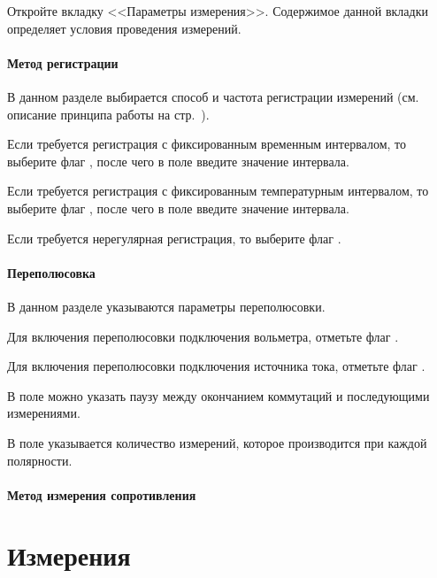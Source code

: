 \documentclass[12pt, a4paper, twocolumn]{report}
\begin{document}
Откройте вкладку <<Параметры измерения>>. Содержимое данной вкладки определяет условия проведения измерений.

\subsubsection{Метод регистрации}
\label{sec_reg_method}

В данном разделе выбирается способ и частота регистрации измерений (см. описание принципа работы на стр.~\pageref{sec_registration_types}).

Если требуется регистрация с фиксированным временным интервалом, то выберите флаг , после чего в поле  введите значение интервала.

Если требуется регистрация с фиксированным температурным интервалом, то выберите флаг , после чего в поле  введите значение интервала.

Если требуется нерегулярная регистрация, то выберите флаг .

\subsubsection{Переполюсовка}
\label{sec_switch}

В данном разделе указываются параметры переполюсовки.

Для включения переполюсовки подключения вольметра, отметьте флаг .

Для включения переполюсовки подключения источника тока, отметьте флаг .

В поле  можно указать паузу между окончанием коммутаций и последующими измерениями.

В поле  указывается количество измерений, которое производится при каждой полярности.

\subsubsection{Метод измерения сопротивления}



\chapter{Измерения}
\end{document}
